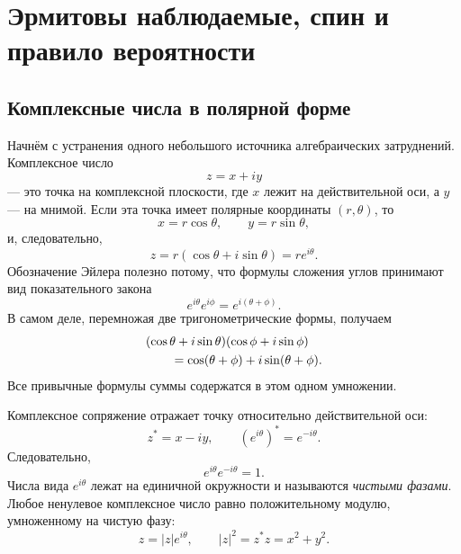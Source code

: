 \chapter{Эрмитовы наблюдаемые, спин и правило вероятности}


\section{Комплексные числа в полярной форме}

Начнём с устранения одного небольшого источника алгебраических затруднений. Комплексное число
\begin{equation}
  z=x+iy
\end{equation}
— это точка на комплексной плоскости, где \(x\) лежит на действительной оси, а \(y\) — на мнимой. Если эта точка имеет полярные координаты \((r,\theta)\), то
\begin{equation}
  x=r\cos\theta,
  \qquad
  y=r\sin\theta,
\end{equation}
и, следовательно,
\begin{equation}
  z=r(\cos\theta+i\sin\theta)=re^{i\theta}.
  \label{eq:l03-polar-form}
\end{equation}
Обозначение Эйлера полезно потому, что формулы сложения углов принимают вид показательного закона
\begin{equation}
  e^{i\theta}e^{i\phi}
  =e^{i(\theta+\phi)}.
  \label{eq:l03-phase-product}
\end{equation}
В самом деле, перемножая две тригонометрические формы, получаем
\begin{align}
& (\cos\theta+i\sin\theta)(\cos\phi+i\sin\phi)
\notag\\
&\qquad=\cos(\theta+\phi)+i\sin(\theta+\phi).
\end{align}
Все привычные формулы суммы содержатся в этом одном умножении.

Комплексное сопряжение отражает точку относительно действительной оси:
\begin{equation}
  z^*=x-iy,
  \qquad
  (e^{i\theta})^*=e^{-i\theta}.
\end{equation}
Следовательно,
\begin{equation}
  e^{i\theta}e^{-i\theta}=1.
\end{equation}
Числа вида \(e^{i\theta}\) лежат на единичной окружности и называются \emph{чистыми фазами}. Любое ненулевое комплексное число равно положительному модулю, умноженному на чистую фазу:
\begin{equation}
  z=|z|e^{i\theta},
  \qquad
  |z|^2=z^*z=x^2+y^2.
  \label{eq:l03-modulus-phase}
\end{equation}

